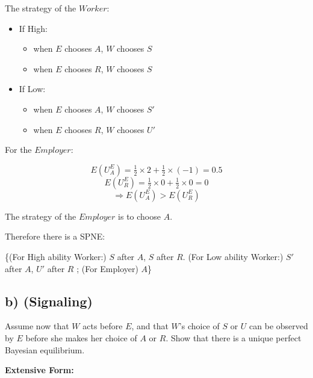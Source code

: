 \documentclass{article}
\begin{document}
\medskip

The strategy of the $Worker$:
\begin{itemize}
\item If High:
\begin{itemize}
\item when $E$ chooses $A$, $W$ chooses $S$
\item when $E$ chooses $R$, $W$ chooses $S$
\end{itemize}
\item If Low:
\begin{itemize}
\item when $E$ chooses $A$, $W$ chooses $S'$
\item when $E$ chooses $R$, $W$ chooses $U'$
\end{itemize}
\end{itemize}

For the $Employer$:

$$E(U^E_A) = \tfrac12 \times 2 +\tfrac12 \times (-1) = 0.5$$
$$E(U^E_R) = \tfrac12 \times 0 +\tfrac12 \times 0 = 0$$
$$\Rightarrow E(U^E_A) > E(U^E_R)$$

The strategy of the $Employer$ is to choose $A$.

\medskip

Therefore there is a SPNE:

\{(For High ability Worker:) $S$ after $A$, $S$ after $R$. (For Low ability Worker:) $S'$ after $A$, $U'$ after $R$ ; (For Employer) $A$\}

\subsection*{b) (Signaling)} Assume now that $W$ acts before $E$, and that $W$'s choice of $S$ or $U$ can be
observed by $E$ before she makes her choice of $A$ or $R$. Show that there is a unique
perfect Bayesian equilibrium.

\medskip

\textbf{Extensive Form:}

\medskip
\end{document}

